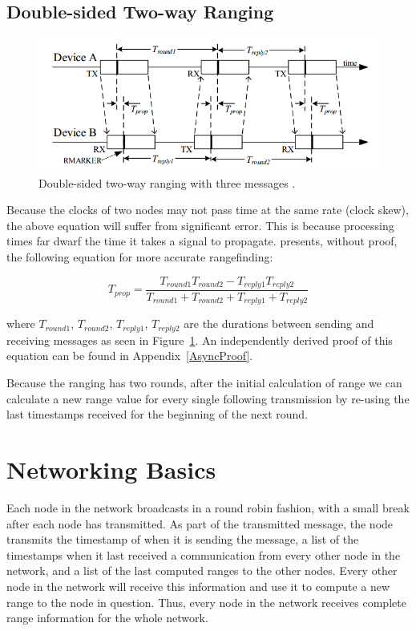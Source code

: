\subsection{Double-sided Two-way Ranging}

\begin{figure}
	\centering
	\includegraphics[width=\linewidth]{Figures/AsyncRanging.png}
	\decoRule
	\caption{Double-sided two-way ranging with three messages \cite{DW1000UserManual}.}
	\label{fig:AsyncRanging}
\end{figure}

Because the clocks of two nodes may not pass time at the same rate (clock skew), the above equation will suffer from significant error. This is because processing times far dwarf the time it takes a signal to propagate. \parencite{DW1000UserManual} presents, without proof, the following equation for more accurate rangefinding:

\[
	T_{prop} = \frac{T_{round1}  T_{round2} - T_{reply1} T_{reply2}}{T_{round1} + T_{round2} + T_{reply1} + T_{reply2}}
\]

where $T_{round1}$, $T_{round2}$, $T_{reply1}$, $T_{reply2}$ are the durations between sending and receiving messages as seen in Figure~\ref{fig:AsyncRanging}. An independently derived proof of this equation can be found in Appendix~\ref{AsyncProof}.

Because the ranging has two rounds, after the initial calculation of range we can calculate a new range value for every single following transmission by re-using the last timestamps received for the beginning of the next round.

\section{Networking Basics}

Each node in the network broadcasts in a round robin fashion, with a small break after each node has transmitted. As part of the transmitted message, the node transmits the timestamp of when it is sending the message, a list of the timestamps when it last received a communication from every other node in the network, and a list of the last computed ranges to the other nodes. Every other node in the network will receive this information and use it to compute a new range to the node in question. Thus, every node in the network receives complete range information for the whole network.


